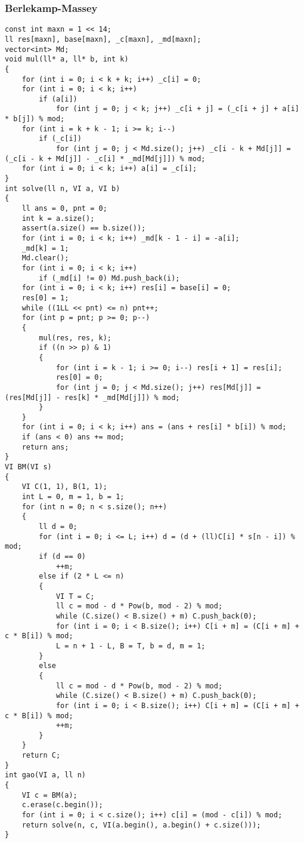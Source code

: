 \documentclass[twoside]{article}
\begin{document}
\subsubsection{Berlekamp-Massey}
\begin{lstlisting}
const int maxn = 1 << 14;
ll res[maxn], base[maxn], _c[maxn], _md[maxn];
vector<int> Md;
void mul(ll* a, ll* b, int k)
{
    for (int i = 0; i < k + k; i++) _c[i] = 0;
    for (int i = 0; i < k; i++)
        if (a[i])
            for (int j = 0; j < k; j++) _c[i + j] = (_c[i + j] + a[i] * b[j]) % mod;
    for (int i = k + k - 1; i >= k; i--)
        if (_c[i])
            for (int j = 0; j < Md.size(); j++) _c[i - k + Md[j]] = (_c[i - k + Md[j]] - _c[i] * _md[Md[j]]) % mod;
    for (int i = 0; i < k; i++) a[i] = _c[i];
}
int solve(ll n, VI a, VI b)
{
    ll ans = 0, pnt = 0;
    int k = a.size();
    assert(a.size() == b.size());
    for (int i = 0; i < k; i++) _md[k - 1 - i] = -a[i];
    _md[k] = 1;
    Md.clear();
    for (int i = 0; i < k; i++)
        if (_md[i] != 0) Md.push_back(i);
    for (int i = 0; i < k; i++) res[i] = base[i] = 0;
    res[0] = 1;
    while ((1LL << pnt) <= n) pnt++;
    for (int p = pnt; p >= 0; p--)
    {
        mul(res, res, k);
        if ((n >> p) & 1)
        {
            for (int i = k - 1; i >= 0; i--) res[i + 1] = res[i];
            res[0] = 0;
            for (int j = 0; j < Md.size(); j++) res[Md[j]] = (res[Md[j]] - res[k] * _md[Md[j]]) % mod;
        }
    }
    for (int i = 0; i < k; i++) ans = (ans + res[i] * b[i]) % mod;
    if (ans < 0) ans += mod;
    return ans;
}
VI BM(VI s)
{
    VI C(1, 1), B(1, 1);
    int L = 0, m = 1, b = 1;
    for (int n = 0; n < s.size(); n++)
    {
        ll d = 0;
        for (int i = 0; i <= L; i++) d = (d + (ll)C[i] * s[n - i]) % mod;
        if (d == 0)
            ++m;
        else if (2 * L <= n)
        {
            VI T = C;
            ll c = mod - d * Pow(b, mod - 2) % mod;
            while (C.size() < B.size() + m) C.push_back(0);
            for (int i = 0; i < B.size(); i++) C[i + m] = (C[i + m] + c * B[i]) % mod;
            L = n + 1 - L, B = T, b = d, m = 1;
        }
        else
        {
            ll c = mod - d * Pow(b, mod - 2) % mod;
            while (C.size() < B.size() + m) C.push_back(0);
            for (int i = 0; i < B.size(); i++) C[i + m] = (C[i + m] + c * B[i]) % mod;
            ++m;
        }
    }
    return C;
}
int gao(VI a, ll n)
{
    VI c = BM(a);
    c.erase(c.begin());
    for (int i = 0; i < c.size(); i++) c[i] = (mod - c[i]) % mod;
    return solve(n, c, VI(a.begin(), a.begin() + c.size()));
}\end{lstlisting}
\end{document}
